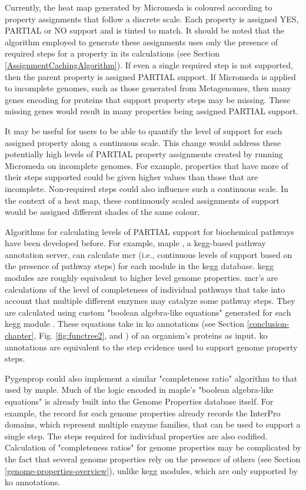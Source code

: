 Currently, the heat map generated by Micromeda is coloured according to property assignments that follow a discrete scale. Each property is assigned YES, PARTIAL or NO support and is tinted to match. It should be noted that the algorithm employed to generate these assignments uses only the presence of required steps for a property in its calculations (see Section \ref{AssignmentCachingAlgorithm}). If even a single required step is not supported, then the parent property is assigned PARTIAL support. If Micromeda is applied to incomplete genomes, such as those generated from Metagenomes, then many genes encoding for proteins that support property steps may be missing. These missing genes would result in many properties being assigned PARTIAL support. 

It may be useful for users to be able to quantify the level of support for each assigned property along a continuous scale. This change would address these potentially high levels of PARTIAL property assignments created by running Micromeda on incomplete genomes. For example, properties that have more of their steps supported could be given higher values than those that are incomplete. Non-required steps could also influence such a continuous scale. In the context of a heat map, these continuously scaled assignments of support would be assigned different shades of the same colour.

Algorithms for calculating levels of PARTIAL support for biochemical pathways have been developed before. For example, \gls{maple} \cite{takami2016automated}, a \gls{kegg}-based pathway annotation server, can calculate \gls{mcr} (i.e., continuous levels of support based on the presence of pathway steps) for each module in the \gls{kegg}  database. \gls{kegg} modules are roughly equivalent to higher level genome properties. \gls{mcr}'s are calculations of the level of completeness of individual pathways that take into account that multiple different enzymes may catalyze some pathway steps. They are calculated using custom "boolean algebra-like equations" generated for each \gls{kegg} module \cite{takami2012evaluation}. These equations take in \gls{ko} annotations (see Section \ref{conclusion-chapter}, Fig. \ref{fig:functree2}, and \cite{mao2005automated}) of an organism's proteins as input. \gls{ko} annotations are equivalent to the step evidence used to support genome property steps. 

Pygenprop could also implement a similar "completeness ratio" algorithm to that used by \gls{maple}. Much of the logic encoded in \gls{maple}'s "boolean algebra-like equations" is already built into the Genome Properties database itself. For example, the record for each genome properties already records the InterPro domains, which represent multiple enzyme families, that can be used to support a single step. The steps required for individual properties are also codified. Calculation of "completeness ratios" for genome properties may be complicated by the fact that several genome properties rely on the presence of others (see Section \ref{genome-properties-overview}), unlike \gls{kegg} modules, which are only supported by \gls{ko} annotations.

